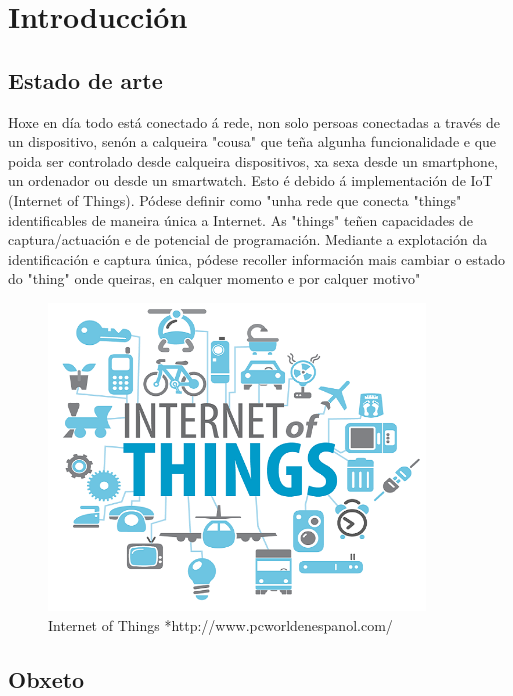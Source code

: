 \documentclass[11pt,twoside]{book}
\begin{document}
\cleardoublepage%

\chapter{Introducción}

\section{Estado de arte}

Hoxe en día todo está conectado á rede, non solo persoas conectadas a través de un dispositivo, senón a calqueira "cousa" que teña algunha funcionalidade e que poida ser controlado desde calqueira dispositivos, xa sexa desde un smartphone, un ordenador ou desde un smartwatch. Esto é debido á implementación de IoT (Internet of Things). Pódese definir como "unha rede que conecta "things" identificables de maneira única a Internet. As "things" teñen capacidades de captura/actuación e de potencial de programación. Mediante a explotación  da identificación e captura única, pódese recoller información mais cambiar o estado do "thing" onde queiras, en calquer momento e por calquer motivo" \cite{IoT}

\begin{figure}[H]
	\begin{center}
		\includegraphics[width=10cm]{images/IoT.png}
	\end{center}
	\caption{Internet of Things *http://www.pcworldenespanol.com/}
	\label{fig:IoT}
\end{figure}

\section{Obxeto}
\end{document}
